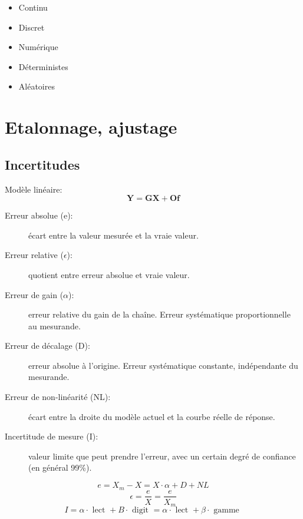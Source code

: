\documentclass[10pt]{article} %
\begin{document}
\begin{multicols}{3}
\begin{flushleft}
			\begin{itemize}
				\item Continu
				\item Discret
				\item Numérique
				\item Déterministes
				\item Aléatoires
			\end{itemize}
		
	\section*{Etalonnage, ajustage}
	
	
		\subsection*{Incertitudes}
		
			Modèle linéaire:
			\[\mathbf{Y}=\mathbf{G} \mathbf{X}+\mathbf{O f}\]
			
			\begin{description}
				\item [Erreur absolue (e): ] écart entre la valeur mesurée et la vraie valeur.
				\item [Erreur relative ($\epsilon$):] quotient entre erreur absolue et vraie valeur.
				\item [Erreur de gain ($\alpha$):] erreur relative du gain de la chaîne. Erreur systématique proportionnelle au mesurande.
				\item [Erreur de décalage (D):] erreur absolue à l'origine. Erreur systématique constante, indépendante du mesurande.
				\item [Erreur de non-linéarité (NL):] écart entre la droite du modèle actuel et la courbe réelle de réponse.
				\item [Incertitude de mesure (I):] valeur limite que peut prendre l'erreur, avec un certain degré de confiance (en général 99\%).
			\end{description}
			
			\[e=X_m-X=X \cdot \alpha+D+N L\]
			\[\epsilon = \frac{e}{X} = \frac{e}{X_m}\]
			\[I=\alpha \cdot \text { lect }+B \cdot \text { digit }=\alpha \cdot \text { lect }+\beta \cdot \text { gamme }\]
			

\end{flushleft}
\end{multicols}
\end{document}
